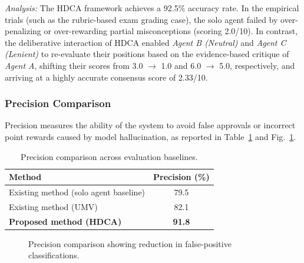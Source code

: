 \documentclass[a4paper,fleqn]{cas-sc}
\begin{document}
\textit{Analysis:} The HDCA framework achieves a 92.5\% accuracy rate. In the empirical trials (such as the rubric-based exam grading case), the solo agent failed by over-penalizing or over-rewarding partial misconceptions (scoring 2.0/10). In contrast, the deliberative interaction of HDCA enabled \textit{Agent B (Neutral)} and \textit{Agent C (Lenient)} to re-evaluate their positions based on the evidence-based critique of \textit{Agent A}, shifting their scores from 3.0 $\rightarrow$ 1.0 and 6.0 $\rightarrow$ 5.0, respectively, and arriving at a highly accurate consensus score of 2.33/10.

\subsubsection{Precision Comparison}
Precision measures the ability of the system to avoid false approvals or incorrect point rewards caused by model hallucination, as reported in Table~\ref{tab:precision} and Fig.~\ref{fig:precision_chart}.

\begin{table}[pos=H]
\caption{Precision comparison across evaluation baselines.}
\label{tab:precision}
\centering
\begin{tabular}{lc}
\hline
\textbf{Method} & \textbf{Precision (\%)} \\
\hline
Existing method (solo agent baseline) & 79.5 \\
Existing method (UMV) & 82.1 \\
\textbf{Proposed method (HDCA)} & \textbf{91.8} \\
\hline
\end{tabular}
\end{table}

\begin{figure}[pos=H]
\centering
{}
\caption{Precision comparison showing reduction in false-positive classifications.}
\label{fig:precision_chart}
\end{figure}
\end{document}
